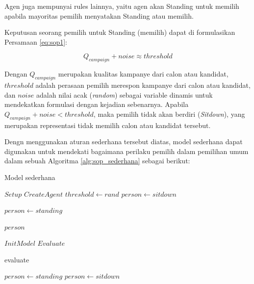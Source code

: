Agen juga mempunyai rules lainnya, yaitu agen akan Standing untuk memilih apabila mayoritas pemilih menyatakan Standing atau memilih.

Keputusan seorang pemilih untuk Standing (memilih) dapat di formulasikan Persamaan \ref{eq:sop1}:

\begin{equation}
Q_{campaign} + noise \approx threshold
\label{eq:sop1}
\end{equation}

Dengan $Q_{campaign}$ merupakan kualitas kampanye dari calon atau kandidat, $threshold$ adalah perasaan pemilih merespon kampanye dari calon atau kandidat, dan $noise$ adalah nilai acak (\textit{random}) sebagai variable dinamis untuk mendekatkan formulasi dengan kejadian sebenarnya. Apabila $Q_{campaign} + noise < threshold$, maka pemilih tidak akan berdiri (\textit{Sitdown}), yang merupakan representasi tidak memilih calon atau kandidat tersebut.

Dengn menggunakan aturan sederhana tersebut diatas, model sederhana dapat digunakan untuk mendekati bagaimana perilaku pemilih dalam pemilihan umum dalam sebuah Algoritma \ref{alg:sop_sederhana} sebagai berikut:

\begin{algorithm}
\caption{Model sederhana}\label{alg:sop_sederhana}
	\begin{algorithmic}[1]
		\State $Setup$
		\State $CreateAgent$
		\State $threshold \longleftarrow rand$ 
		\State $person \longleftarrow sitdown$ 
	\EndProcedure

			\State $person \longleftarrow standing$ 
		\EndIf

		\Return $person$
	\EndProcedure

		\Require $InitModel$
		\Require $Evaluate$

			\State evaluate

				\State $person \longleftarrow standing$
			\Else
				\State $person \longleftarrow sitdown$
			\EndIf
		\EndFor\label{simplemodelforloop}
	\EndProcedure
	\end{algorithmic}
\end{algorithm}


